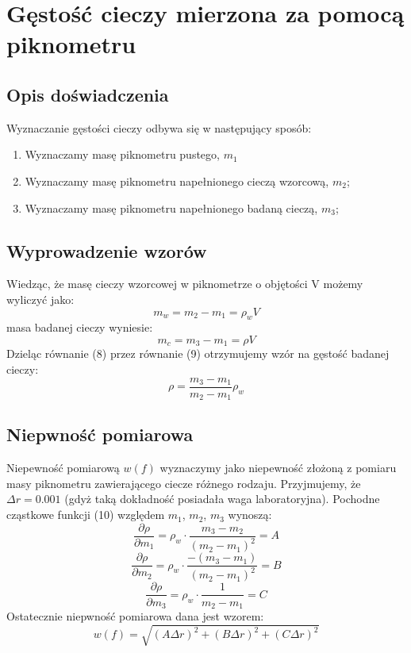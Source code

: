 \documentclass{article} %
\begin{document}
\section{Gęstość cieczy mierzona za pomocą piknometru}
\subsection{Opis doświadczenia}
Wyznaczanie gęstości cieczy odbywa się w następujący sposób:
\begin{enumerate}
    \item Wyznaczamy masę piknometru pustego, $m_1$ 
    \item Wyznaczamy masę piknometru napełnionego cieczą wzorcową, $m_2$;
    \item Wyznaczamy masę piknometru napełnionego badaną cieczą, $m_3$;
\end{enumerate}
\subsection{Wyprowadzenie wzorów}
Wiedząc, że masę cieczy wzorcowej w piknometrze o objętości V możemy
wyliczyć jako:
\begin{equation}
    m_w = m_2 - m_1 = \rho_wV
\end{equation}
masa badanej cieczy wyniesie:
\begin{equation}
    m_c = m_3 - m_1 = \rho V
\end{equation}
Dzieląc równanie (8) przez równanie (9) otrzymujemy wzór na gęstość badanej cieczy:
\begin{equation}
    \rho = \frac{m_3 - m_1}{m_2 - m_1}\rho_w
\end{equation}
\subsection{Niepwność pomiarowa}
Niepewność pomiarową $w(f)$ wyznaczymy jako niepewność złożoną z pomiaru masy piknometru zawierającego ciecze różnego rodzaju. Przyjmujemy, że $\Delta r = 0.001$ (gdyż taką dokładność posiadała waga laboratoryjna). Pochodne cząstkowe funkcji (10) względem $m_1$, $m_2$, $m_3$ wynoszą:
\begin{equation}
    \frac{\partial \rho}{\partial m_1} = \rho_w \cdot \frac{m_3 - m_2}{(m_2 - m_1)^2} = A
\end{equation}
\begin{equation}
    \frac{\partial \rho}{\partial m_2} = \rho_w \cdot \frac{-(m_3 - m_1)}{(m_2 - m_1)^2} = B   
\end{equation}
\begin{equation}
    \frac{\partial \rho}{\partial m_3} = \rho_w \cdot \frac{1}{m_2 - m_1} = C
\end{equation}
Ostatecznie niepwność pomiarowa dana jest wzorem:
{\large
    \begin{equation}
        w(f)=\sqrt{(A\Delta r)^2+(B\Delta r)^2+(C\Delta r)^2}
    \end{equation}
}
\end{document}
